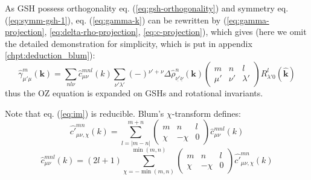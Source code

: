 As \acs{GSH} possess orthogonality eq. (\ref{eq:gsh-orthogonality})
and symmetry eq. (\ref{eq:symm-gsh-1}), eq. (\ref{eq:gamma-k}) can
be rewritten by (\ref{eq:gamma-projection}, \ref{eq:delta-rho-projection},
\ref{eq:c-projection}), which gives (here we omit the detailed demonstration
for simplicity, which is put in appendix \ref{chpt:deduction_blum}):
\begin{equation}
\hat{\gamma}_{\mu'\mu}^{m}(\mathbf{k})=\sum_{nl\nu}\hat{c}_{\mu\nu}^{mnl}(k)\sum_{\nu'\lambda'}\left(-\right){}^{\nu'+\nu}\Delta\hat{\rho}_{\underline{\nu'}\underline{\nu}}^{n}(\mathbf{k})\left(\begin{array}{ccc}
m & n & l\\
\mu' & \nu' & \lambda'
\end{array}\right)R_{\lambda'0}^{l}(\hat{\mathbf{k}})\label{eq:im}
\end{equation}
thus the \acs{OZ} equation is expanded on \acs{GSH}s and rotational
invariants.

Note that eq. (\ref{eq:im}) is reducible. Blum's $\chi$-transform
\citep{Blum_II} defines:
\begin{equation}
\hat{c'}_{\mu\nu,\chi}^{mn}(k)=\sum_{l=\left|m-n\right|}^{m+n}\left(\begin{array}{ccc}
m & n & l\\
\chi & -\chi & 0
\end{array}\right)\hat{c}_{\mu\nu}^{mnl}(k)
\end{equation}
\begin{equation}
\hat{c}_{\mu\nu}^{mnl}(k)=\left(2l+1\right)\sum_{\chi=-\min(m,n)}^{\min(m,n)}\left(\begin{array}{ccc}
m & n & l\\
\chi & -\chi & 0
\end{array}\right)\hat{c'}_{\mu\nu,\chi}^{mn}(k)\label{eq:c-p}
\end{equation}


